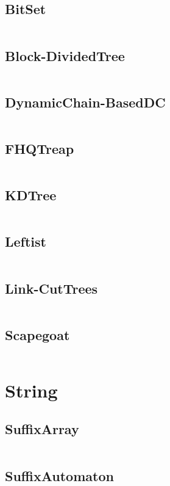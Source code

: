   \subsection{BitSet}
    \inputminted{cpp}{src/4_Data Structures/2_BitSet.cpp}
  \subsection{Block-DividedTree}
    \inputminted{cpp}{src/4_Data Structures/3_Block-DividedTree.cpp}
  \subsection{DynamicChain-BasedDC}
    \inputminted{cpp}{src/4_Data Structures/4_DynamicChain-BasedDC.cpp}
  \subsection{FHQTreap}
    \inputminted{cpp}{src/4_Data Structures/5_FHQTreap.cpp}
  \subsection{KDTree}
    \inputminted{cpp}{src/4_Data Structures/6_KDTree.cpp}
  \subsection{Leftist}
    \inputminted{cpp}{src/4_Data Structures/7_Leftist.cpp}
  \subsection{Link-CutTrees}
    \inputminted{cpp}{src/4_Data Structures/8_Link-CutTrees.cpp}
  \subsection{Scapegoat}
    \inputminted{cpp}{src/4_Data Structures/9_Scapegoat.cpp}
\section{String}
  \subsection{SuffixArray}
    \inputminted{cpp}{src/5_String/1_SuffixArray.cpp}
  \subsection{SuffixAutomaton}
    \inputminted{cpp}{src/5_String/2_SuffixAutomaton.cpp}
